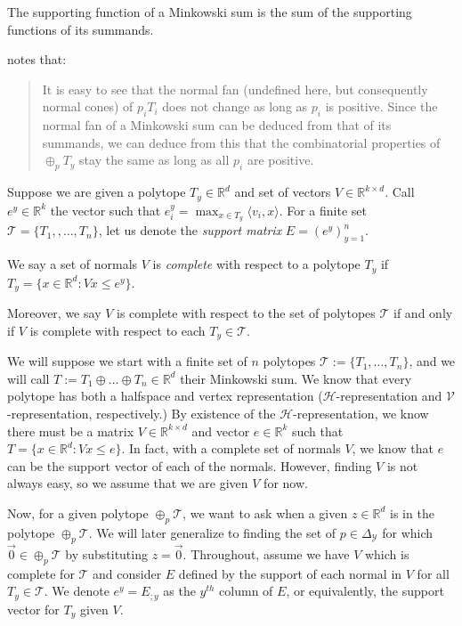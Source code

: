 \documentclass[final]{colt2020} %
\newcommand{\reals}{\mathbb{R}}
\newcommand{\simplex}{\Delta_\Y}
\renewcommand{\H}{\mathcal{H}}
\newcommand{\T}{\mathcal{T}}
\newcommand{\V}{\mathcal{V}}
\newcommand{\Y}{\mathcal{Y}}
\newcommand{\inprod}[2]{\langle #1, #2 \rangle}%
\begin{document}
\begin{theorem}\label{thm:support-minksum}
	The supporting function of a Minkowski sum is the sum of the supporting functions of its summands.
\end{theorem}


\citet{weibel2007minkowski} notes that:
\begin{quote}
	It is easy to see that the normal fan (undefined here, but consequently normal cones) of $p_i T_i$ does not change as long as $p_i$ is positive.  Since the normal fan of a Minkowski sum can be deduced from that of its summands, we can deduce from this that the combinatorial properties of $\oplus_p T_y$ stay the same as long as all $p_i$ are positive.
\end{quote}

Suppose we are given a polytope $T_y \in \reals^d$ and set of vectors $V \in \reals^{k \times d}$.
Call $e^y \in \reals^k$ the vector such that $e^y_i = \max_{x \in T_y}\inprod{v_i}{x}$.  
For a finite set $\T = \{T_1, , \ldots, T_n\}$, let us denote the \emph{support matrix} $E = (e^y)_{y=1}^n$.
\begin{definition}\label{def:complete}
	We say a set of normals $V$ is \emph{complete} with respect to a polytope $T_y$ if $T_y = \{x \in \reals^d: Vx \leq e^y\}$.
\end{definition}
Moreover, we say $V$ is complete with respect to the set of polytopes $\T$ if and only if $V$ is complete with respect to each $T_y \in \T$.


We will suppose we start with a finite set of $n$ polytopes $\T := \{T_1, \ldots, T_n\}$, and we will call $T := T_1 \oplus \ldots \oplus T_n \in \reals^d$ their Minkowski sum.
We know that every polytope has both a halfspace and vertex representation ($\H$-representation and $\V$-representation, respectively.)
By existence of the $\H$-representation, we know there must be a matrix $V \in \reals^{k \times d}$ and vector $e \in \reals^k$ such that $T = \{x \in \reals^d : Vx \leq e\}$.
In fact, with a complete set of normals $V$, we know that $e$ can be the support vector of each of the normals.
However, finding $V$ is not always easy, so we assume that we are given $V$ for now.

Now, for a given polytope $\oplus_p \T$, we want to ask when a given $z \in \reals^d$ is in the polytope $\oplus_p \T$.
We will later generalize to finding the set of $p \in \simplex$ for which $\vec 0 \in \oplus_p \T$ by substituting $z= \vec 0$.
Throughout, assume we have $V$ which is complete for $\T$ and consider $E$ defined by the support of each normal in $V$ for all $T_y \in \T$.
We denote $e^y = E_{;y}$ as the $y^{th}$ column of $E$, or equivalently, the support vector for $T_y$ given $V$.
\end{document}
